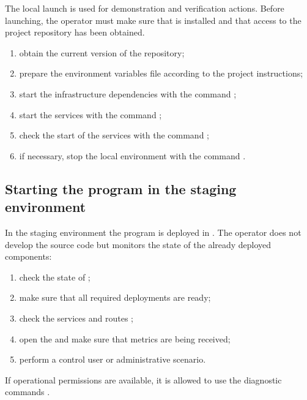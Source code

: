 \documentclass[12pt,a4paper]{extarticle}
\begin{document}
\begin{hseExample}
The local launch is used for demonstration and verification actions. Before launching, the operator must make sure that  is installed and that access to the project repository has been obtained.

\begin{enumerate}[label=\arabic*), leftmargin=1.25cm]
    \item obtain the current version of the repository;
    \item prepare the environment variables file according to the project instructions;
    \item start the infrastructure dependencies with the command ;
    \item start the services with the command ;
    \item check the start of the services with the command ;
    \item if necessary, stop the local environment with the command .
\end{enumerate}
\end{hseExample}

\subsection{Starting the program in the staging environment}

\begin{hseExample}
In the staging environment the program is deployed in . The operator does not develop the source code but monitors the state of the already deployed components:

\begin{enumerate}[label=\arabic*), leftmargin=1.25cm]
    \item check the state of ;
    \item make sure that all required deployments are ready;
    \item check the services and routes ;
    \item open the  and make sure that metrics are being received;
    \item perform a control user or administrative scenario.
\end{enumerate}

If operational permissions are available, it is allowed to use the diagnostic commands .
\end{hseExample}
\end{document}
